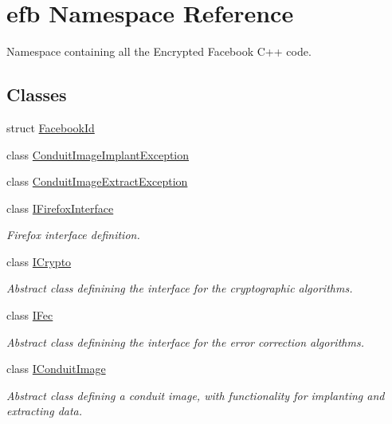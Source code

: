 \hypertarget{namespaceefb}{
\section{efb Namespace Reference}
\label{namespaceefb}
}


Namespace containing all the Encrypted Facebook C++ code.  


\subsection*{Classes}
\begin{DoxyCompactItemize}
\item 
struct \hyperlink{structefb_1_1FacebookId}{FacebookId}
\item 
class \hyperlink{classefb_1_1ConduitImageImplantException}{ConduitImageImplantException}
\item 
class \hyperlink{classefb_1_1ConduitImageExtractException}{ConduitImageExtractException}
\item 
class \hyperlink{classefb_1_1IFirefoxInterface}{IFirefoxInterface}
\begin{DoxyCompactList}\small\item\em Firefox interface definition. \item\end{DoxyCompactList}\item 
class \hyperlink{classefb_1_1ICrypto}{ICrypto}
\begin{DoxyCompactList}\small\item\em Abstract class definining the interface for the cryptographic algorithms. \item\end{DoxyCompactList}\item 
class \hyperlink{classefb_1_1IFec}{IFec}
\begin{DoxyCompactList}\small\item\em Abstract class definining the interface for the error correction algorithms. \item\end{DoxyCompactList}\item 
class \hyperlink{classefb_1_1IConduitImage}{IConduitImage}
\begin{DoxyCompactList}\small\item\em Abstract class defining a conduit image, with functionality for implanting and extracting data. \item\end{DoxyCompactList}\item 

\end{DoxyCompactItemize}
